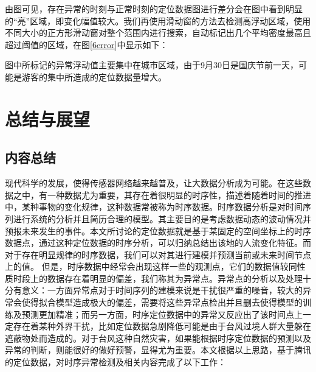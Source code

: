 \documentclass[a4paper,AutoFakeBold,oneside,12pt]{book}
\begin{document}
	由图可见，存在异常的时刻与正常时刻的定位数据图进行差分会在图中看到明显的“亮”区域，即变化幅值较大。我们再使用滑动窗的方法去检测高浮动区域，使用不同大小的正方形滑动窗对整个范围内进行搜索，自动标记出几个平均密度最高且超过阈值的区域，在图\ref{6error}中显示如下：


	图中所标记的异常浮动值主要集中在城市区域，由于9月30日是国庆节前一天，可能是游客的集中所造成的定位数据量增大。 

\chapter{总结与展望}


\section{内容总结}
	现代科学的发展，使得传感器网络越来越普及，让大数据分析成为可能。在这些数据之中，有一种数据尤为重要，其存在着很明显的时序性，描述着随着时间的推进中，某种事物的变化规律，这种数据常被称为时序数据。时序数据分析是对时间序列进行系统的分析并且简历合理的模型。其主要目的是考虑数据动态的波动情况并预报未来发生的事件。本文所讨论的定位数据就是基于某固定的空间坐标上的时序数据点，通过这种定位数据的时序分析，可以归纳总结出该地的人流变化特征。而对于存在明显规律的时序数据，我们可以对其进行建模并预测当前或未来时间节点上的值。
	但是，时序数据中经常会出现这样一些的观测点，它们的数据值较同性质时段上的数据存在着明显的偏差，我们称其为异常点。异常点的分析以及处理十分有意义：一方面异常点对于时间序列的建模来说是干扰很严重的噪音，较大的异常会使得拟合模型造成极大的偏差，需要将这些异常点检出并且删去使得模型的训练及预测更加精准；而另一方面，时序定位数据中的异常又反应出了该时间点上一定存在着某种外界干扰，比如定位数据急剧降低可能是由于台风过境人群大量躲在遮蔽物处而造成的。对于台风这种自然灾害，如果能根据时序定位数据的预测以及异常的判断，则能很好的做好预警，显得尤为重要。本文根据以上思路，基于腾讯的定位数据，对时序异常检测及相关内容完成了以下工作：
\end{document}

